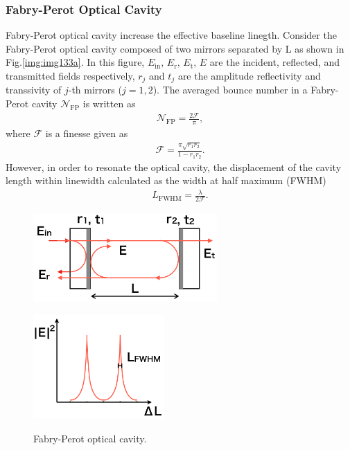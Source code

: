 \subsubsection{Fabry-Perot Optical Cavity}
Fabry-Perot optical cavity increase the effective baseline linegth. Consider the Fabry-Perot optical cavity composed of two mirrors separated by L as shown in Fig.\ref{img:img133a}. In this figure, $E_{\mathrm{in}},\,E_{\mathrm{r}},\,E_{\mathrm{t}},\,E$ are the incident, reflected, and transmitted fields respectively, $r_{j}$ and $t_{j}$ are the amplitude reflectivity and transsivity of $j$-th mirrors ($j=1,2$). The averaged bounce number in a Fabry-Perot cavity $\mathcal{N}_{\mathrm{FP}}$ is written as \cite{ando1999power}
\begin{eqnarray}
  \mathcal{N}_{\mathrm{FP}} = \frac{2\mathcal{F}}{\pi},
\end{eqnarray}
where $\mathcal{F}$ is a finesse given as
\begin{eqnarray}
  \mathcal{F}=\frac{\pi \sqrt{r_{1} r_{2}}}{1-r_{1} r_{2}}.
\end{eqnarray}
However, in order to resonate the optical cavity, the displacement of the cavity length within linewidth calculated as the width at half maximum (FWHM) 
\begin{eqnarray}
  L_{\mathrm{FWHM}} = \frac{\lambda}{2\mathcal{F}}\label{eq:eq131}.
\end{eqnarray}


\begin{figure}[h]
  \begin{minipage}[b]{0.5\hsize}
    \begin{center}   
      \includegraphics[width=7cm]{./img_chap1/img133a.png}
       \label{img:img133a}
    \end{center}
  \end{minipage}\hspace{3pt}
  \begin{minipage}[b]{0.5\hsize}
    \begin{center}   
      \includegraphics[width=5cm]{./img_chap1/img133b.png}
       \label{img:img133b}
    \end{center}    
  \end{minipage}
  \caption{Fabry-Perot optical cavity.}
\end{figure}


